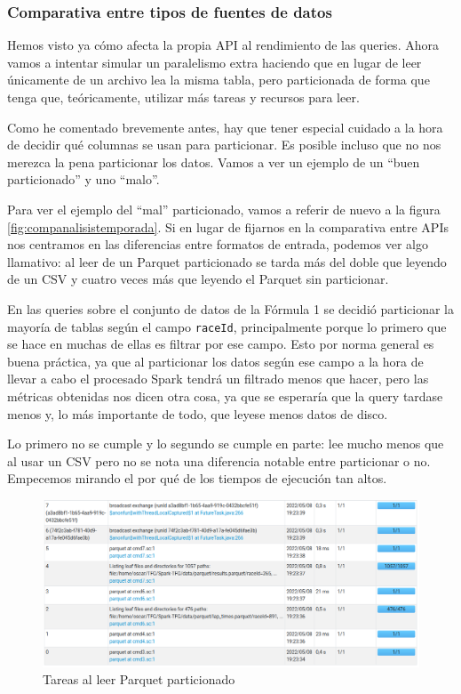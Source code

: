 \documentclass[12pt,twoside,titlepage]{report}
\newcommand{\quotes}[1]{``#1''}
\begin{document}
\subsubsection{Comparativa entre tipos de fuentes de datos}

Hemos visto ya cómo afecta la propia API al rendimiento de las queries. Ahora vamos a intentar simular un paralelismo extra haciendo que en lugar de leer únicamente de un archivo lea la misma tabla, pero particionada de forma que tenga que, teóricamente, utilizar más tareas y recursos para leer.

Como he comentado brevemente antes, hay que tener especial cuidado a la hora de decidir qué columnas se usan para particionar. Es posible incluso que no nos merezca la pena particionar los datos. Vamos a ver un ejemplo de un \quotes{buen particionado} y uno \quotes{malo}.

Para ver el ejemplo del \quotes{mal} particionado, vamos a referir de nuevo a la figura \ref{fig:companalisistemporada}. Si en lugar de fijarnos en la comparativa entre APIs nos centramos en las diferencias entre formatos de entrada, podemos ver algo llamativo: al leer de un Parquet particionado se tarda más del doble que leyendo de un CSV y cuatro veces más que leyendo el Parquet sin particionar. 

En las queries sobre el conjunto de datos de la Fórmula 1 se decidió particionar la mayoría de tablas según el campo \texttt{raceId}, principalmente porque lo primero que se hace en muchas de ellas es filtrar por ese campo. Esto por norma general es buena práctica, ya que al particionar los datos según ese campo a la hora de llevar a cabo el procesado Spark tendrá un filtrado menos que hacer, pero las métricas obtenidas nos dicen otra cosa, ya que se esperaría que la query tardase menos y, lo más importante de todo, que leyese menos datos de disco.

Lo primero no se cumple y lo segundo se cumple en parte: lee mucho menos que al usar un CSV pero no se nota una diferencia notable entre particionar o no. Empecemos mirando el por qué de los tiempos de ejecución tan altos.

\begin{figure}[H]
	\includegraphics[scale=0.35]{tareaslecturaparquet.png}
	\centering
	\caption{Tareas al leer Parquet particionado}
	\label{fig:tareaslecturaparquet}
	\centering
\end{figure}
\end{document}
